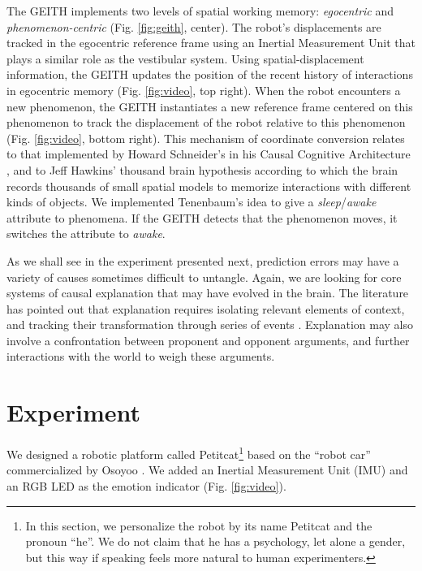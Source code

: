 \documentclass[runningheads]{llncs}
\begin{document}
The GEITH implements two levels of spatial working memory: \textit{egocentric} and \textit{phenomenon-centric} (Fig. \ref{fig:geith}, center).  
The robot's displacements are tracked in the egocentric reference frame using an Inertial Measurement Unit that plays a similar role as the vestibular system. 
Using spatial-displacement information, the GEITH updates the position of the recent history of interactions in egocentric memory (Fig. \ref{fig:video}, top right).
When the robot encounters a new phenomenon, the GEITH instantiates a new reference frame centered on this phenomenon to track the displacement of the robot relative to this phenomenon (Fig. \ref{fig:video}, bottom right). 
This mechanism of coordinate conversion relates to that implemented by Howard Schneider's in his Causal Cognitive Architecture \cite{schneider_enabling_2020}, and to 
Jeff Hawkins' thousand brain hypothesis \cite{hawkins_framework_2019} according to which the brain records thousands of small spatial models to memorize interactions with different kinds of objects.
We implemented Tenenbaum's idea to give a \textit{sleep}/\textit{awake} attribute to phenomena. If the GEITH detects that the phenomenon moves, it switches the attribute to \textit{awake}.

As we shall see in the experiment presented next, prediction errors may have a variety of causes sometimes difficult to untangle. 
Again, we are looking for core systems of causal explanation that may have evolved in the brain.
The literature has pointed out that explanation requires isolating relevant elements of context, and tracking their transformation through series of events \cite{thorisson_explanation_2021}. 
Explanation may also involve a confrontation between proponent and opponent arguments, and further interactions with the world to weigh these arguments. 


\section{Experiment}
\label{sec:expe}

We designed a robotic platform called Petitcat\footnote{In this section, we personalize the robot by its name Petitcat and the pronoun ``he''. We do not claim that he has a psychology, let alone a gender, but this way if speaking feels more natural to human experimenters.} based on the ``robot car'' commercialized by Osoyoo \cite{osoyoo_robot_car}.
We added an Inertial Measurement Unit (IMU) and an RGB LED as the emotion indicator (Fig. \ref{fig:video}). 
\end{document}
